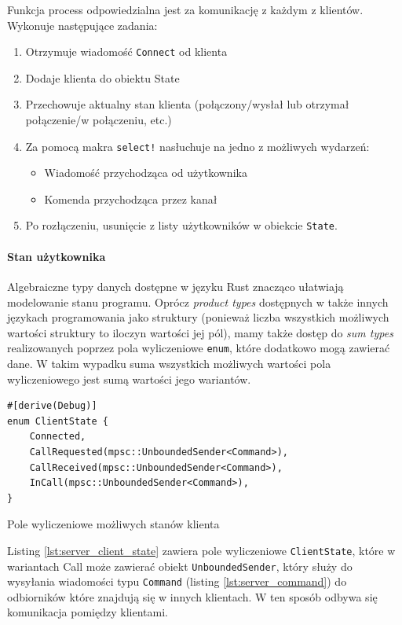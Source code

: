 Funkcja process odpowiedzialna jest za komunikację z każdym z klientów. Wykonuje następujące
zadania:

\begin{enumerate}
    \item Otrzymuje wiadomość \verb|Connect| od klienta
    \item Dodaje klienta do obiektu State
    \item Przechowuje aktualny stan klienta (połączony/wysłał lub otrzymał połączenie/w połączeniu,
          etc.)
    \item Za pomocą makra \verb|select!| nasłuchuje na jedno z możliwych wydarzeń:
          \begin{itemize}
              \item Wiadomość przychodząca od użytkownika
              \item Komenda przychodząca przez kanał
          \end{itemize}
    \item Po rozłączeniu, usunięcie z listy użytkowników w obiekcie \verb|State|.
\end{enumerate}

\paragraph{Stan użytkownika}

Algebraiczne typy danych dostępne w języku Rust znacząco ułatwiają modelowanie stanu programu.
Oprócz \emph{product types} dostępnych w także innych językach programowania jako struktury
(ponieważ liczba wszystkich możliwych wartości struktury to iloczyn wartości jej pól), mamy także
dostęp do \emph{sum types} realizowanych poprzez pola wyliczeniowe \verb|enum|, które dodatkowo mogą
zawierać dane. W takim wypadku suma wszystkich możliwych wartości pola wyliczeniowego jest sumą
wartości jego wariantów.

\begin{listing}[H]
    \begin{verbatim}
#[derive(Debug)]
enum ClientState {
    Connected,
    CallRequested(mpsc::UnboundedSender<Command>),
    CallReceived(mpsc::UnboundedSender<Command>),
    InCall(mpsc::UnboundedSender<Command>),
}
    \end{verbatim}
    \caption{Pole wyliczeniowe możliwych stanów klienta}
    \label{lst:server_client_state}
\end{listing}

Listing \ref{lst:server_client_state} zawiera pole wyliczeniowe \verb|ClientState|, które w
wariantach Call może zawierać obiekt \verb|UnboundedSender|, który służy do wysyłania wiadomości
typu \verb|Command| (listing \ref{lst:server_command}) do odbiorników które znajdują się w innych
klientach. W ten sposób odbywa się komunikacja pomiędzy klientami.

